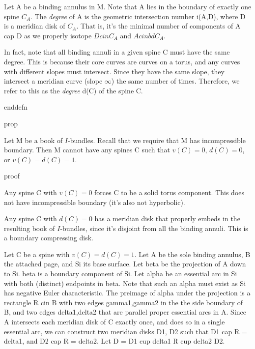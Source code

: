 Let A be a binding annulus in M. Note that A lies in the boundary of exactly
one spine $C_A$. The \emph{degree} of A is the geometric intersection number
i(A,D), where D is a meridian disk of $C_A$. That is, it's the minimal number
of components of A cap D as we properly isotope $D cin C_A$ and $A cin bd C_A$.

In fact, note that all binding annuli in a given spine C must have the same
degree. This is because their core curves are curves on a torus, and any curves
with different slopes must intersect. Since they have the same slope, they
intersect a meridian curve (slope $\infty$) the same number of times.
Therefore, we refer to this as the \emph{degree} d(C) of the spine C.

enddefn

prop

Let M be a book of $I$-bundles. Recall that we require that M has incompressible
boundary. Then M cannot have any spines C such that $v(C)=0$, $d(C)=0$, or
$v(C)=d(C)=1$.

proof

Any spine C with $v(C)=0$ forces C to be a solid torus component. This does not
have incompressible boundary (it's also not hyperbolic).

Any spine C with $d(C)=0$ has a meridian disk that properly embeds in the
resulting book of $I$-bundles, since it's disjoint from all the binding annuli.
This is a boundary compressing disk.


Let C be a spine with $v(C)=d(C)=1$. Let A be the sole binding annulus, B the
attached page, and Si its base surface. Let beta be the projection of A down to
Si. beta is a boundary component of Si. Let alpha be an essential arc in Si
with both (distinct) endpoints in beta. Note that such an alpha must exist as
Si has negative Euler characteristic. The preimage of alpha under the
projection is a rectangle R cin B with two edges gamma1,gamma2 in the the side
boundary of B, and two edges delta1,delta2 that are parallel proper essential
arcs in A.  Since A intersects each meridian disk of C exactly once, and does
so in a single essential arc, we can construct two meridian disks D1, D2 such
that D1 cap R = delta1, and D2 cap R = delta2. Let D = D1 cup delta1 R cup
delta2 D2.

